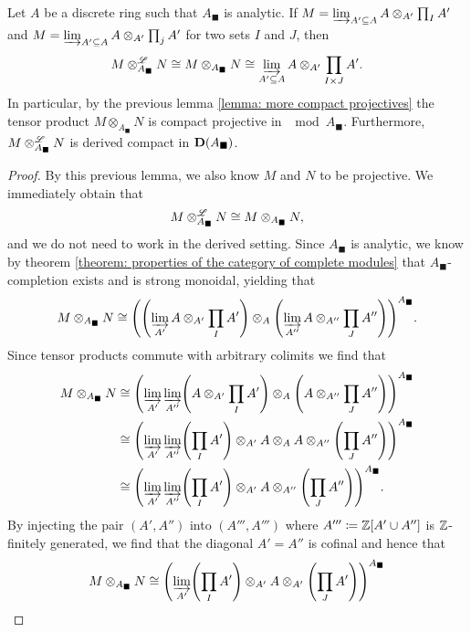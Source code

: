 \begin{corollary}
	\label{corollary: tensor products of compacts, general case}
		
	Let $A$ be a discrete ring such that $A_\blacksquare$ is analytic. If $M = \varinjlim_{A'\subseteq A} A\otimes_{A'} \prod_I A'$ and $M = \varinjlim_{A'\subseteq A} A\otimes_{A'} \prod_j A'$ for two sets $I$ and $J$, then
		$$M\otimes^{\mathscr{L}}_{A_\blacksquare} N \cong M\otimes_{A_\blacksquare} N\cong \varinjlim_{A'\subseteq A} A\otimes_{A'} \prod_{I\times J} A'.$$
	In particular, by the previous lemma \ref{lemma: more compact projectives} the tensor product $M\otimes_{A_\blacksquare} N$ is compact projective in $\mod{A_\blacksquare}$. Furthermore, $M\otimes^{\mathscr{L}}_{A_\blacksquare} N$ is derived compact in ${{\mathbf{D}}(A_\blacksquare)}$.
\end{corollary}
\begin{proof}
	By this previous lemma, we also know $M$ and $N$ to be projective. We immediately obtain that
		$$M\otimes^{\mathscr{L}}_{A_\blacksquare} N \cong M\otimes_{A_\blacksquare} N,$$
	and we do not need to work in the derived setting. Since $A_\blacksquare$ is analytic, we know by theorem \ref{theorem: properties of the category of complete modules} that $A_\blacksquare$-completion exists and is strong monoidal, yielding that
		$$M\otimes_{A_\blacksquare} N \cong \completion{\mleft(\colimit_{A'} A\otimes_{A'} \prod_I A'\mright)\otimes_A \mleft(\colimit_{A''} A\otimes_{A''} \prod_J A''\mright)}{A_\blacksquare}.$$
	Since tensor products commute with arbitrary colimits we find that
	\begin{align*}
		M\otimes_{A_\blacksquare} N &\cong \completion{\colimit_{A'}\colimit_{A''} \mleft(A\otimes_{A'} \prod_I A'\mright) \otimes_A \mleft(A\otimes_{A''} \prod_J A''\mright)}{A_\blacksquare}\\
		&\cong \completion{\colimit_{A'}\colimit_{A''} \mleft(\prod_I A'\mright)\otimes_{A'} A \otimes_A A\otimes_{A''} \mleft(\prod_J A''\mright)}{A_\blacksquare}\\
		&\cong \completion{\colimit_{A'}\colimit_{A''} \mleft(\prod_I A'\mright)\otimes_{A'} A \otimes_{A''} \mleft(\prod_J A''\mright)}{A_\blacksquare}.
	\end{align*}
	By injecting the pair $(A', A'')$ into $(A''', A''')$ where $A''' \coloneqq {\mathbb{Z}}[A'\cup A'']$ is ${\mathbb{Z}}$-finitely generated, we find that the diagonal $A'=A''$ is cofinal and hence that
	\begin{align*}
		M\otimes_{A_\blacksquare} N &\cong \completion{\colimit_{A'} \mleft(\prod_I A'\mright)\otimes_{A'} A \otimes_{A'} \mleft(\prod_J A'\mright)}{A_\blacksquare}\\

\end{align*}
\end{proof}
